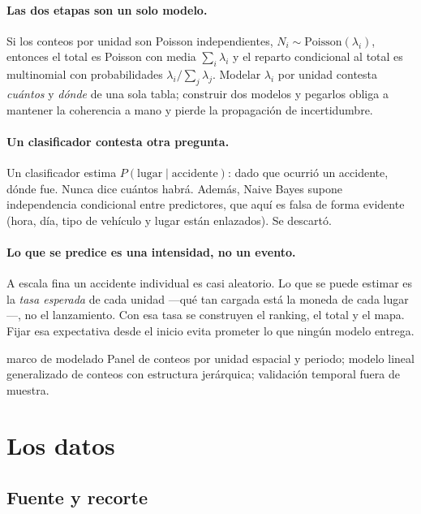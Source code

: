 \documentclass[11pt,a4paper]{article}
\newcommand{\Pois}{\mathrm{Poisson}}
\begin{document}
\paragraph{Las dos etapas son un solo modelo.}
Si los conteos por unidad son Poisson independientes, $N_i \sim \Pois(\lambda_i)$,
entonces el total es Poisson con media $\sum_i \lambda_i$ y el reparto
condicional al total es multinomial con probabilidades $\lambda_i/\sum_j \lambda_j$.
Modelar $\lambda_i$ por unidad contesta \emph{cuántos} y \emph{dónde} de una
sola tabla; construir dos modelos y pegarlos obliga a mantener la coherencia a
mano y pierde la propagación de incertidumbre.

\paragraph{Un clasificador contesta otra pregunta.}
Un clasificador estima $P(\text{lugar} \mid \text{accidente})$: dado que ocurrió
un accidente, dónde fue. Nunca dice cuántos habrá. Además, Naive Bayes supone
independencia condicional entre predictores, que aquí es falsa de forma
evidente (hora, día, tipo de vehículo y lugar están enlazados). Se descartó.

\paragraph{Lo que se predice es una intensidad, no un evento.}
A escala fina un accidente individual es casi aleatorio. Lo que se puede
estimar es la \emph{tasa esperada} de cada unidad —qué tan cargada está la
moneda de cada lugar—, no el lanzamiento. Con esa tasa se construyen el
ranking, el total y el mapa. Fijar esa expectativa desde el inicio evita
prometer lo que ningún modelo entrega.

\begin{decision}{marco de modelado}
Panel de conteos por unidad espacial y periodo; modelo lineal generalizado de
conteos con estructura jerárquica; validación temporal fuera de muestra.
\end{decision}

\section{Los datos}

\subsection{Fuente y recorte}
\end{document}
